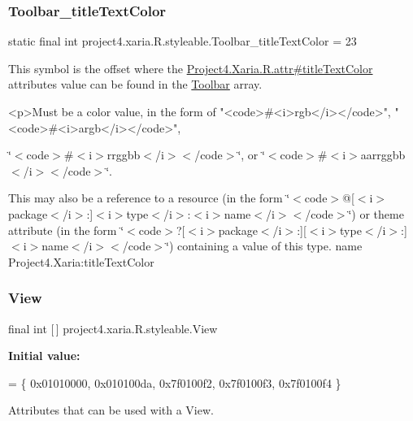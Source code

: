 \subsubsection{\texorpdfstring{Toolbar\+\_\+title\+Text\+Color}{Toolbar\_titleTextColor}}
{\footnotesize\ttfamily static final int project4.\+xaria.\+R.\+styleable.\+Toolbar\+\_\+title\+Text\+Color = 23\hspace{0.3cm}{\ttfamily [static]}}

This symbol is the offset where the \hyperlink{}{Project4.\+Xaria.\+R.\+attr\#title\+Text\+Color} attribute\textquotesingle{}s value can be found in the \hyperlink{classproject4_1_1xaria_1_1R_1_1styleable_af6c30f9e9e086f6bf4e510669443fa59}{Toolbar} array.

\begin{DoxyVerb}      <p>Must be a color value, in the form of "<code>#<i>rgb</i></code>", "<code>#<i>argb</i></code>",
\end{DoxyVerb}
 \char`\"{}$<$code$>$\#$<$i$>$rrggbb$<$/i$>$$<$/code$>$\char`\"{}, or \char`\"{}$<$code$>$\#$<$i$>$aarrggbb$<$/i$>$$<$/code$>$\char`\"{}. 

This may also be a reference to a resource (in the form \char`\"{}$<$code$>$@\mbox{[}$<$i$>$package$<$/i$>$\+:\mbox{]}$<$i$>$type$<$/i$>$\+:$<$i$>$name$<$/i$>$$<$/code$>$\char`\"{}) or theme attribute (in the form \char`\"{}$<$code$>$?\mbox{[}$<$i$>$package$<$/i$>$\+:\mbox{]}\mbox{[}$<$i$>$type$<$/i$>$\+:\mbox{]}$<$i$>$name$<$/i$>$$<$/code$>$\char`\"{}) containing a value of this type.  name Project4.\+Xaria\+:title\+Text\+Color \mbox{\label{classproject4_1_1xaria_1_1R_1_1styleable_a26a934fb1a597b7811923bdd4d3d8ecf}} 
\subsubsection{\texorpdfstring{View}{View}}
{\footnotesize\ttfamily final int \mbox{[}$\,$\mbox{]} project4.\+xaria.\+R.\+styleable.\+View\hspace{0.3cm}{\ttfamily [static]}}

{\bfseries Initial value\+:}
\begin{DoxyCode}
= \{
            0x01010000, 0x010100da, 0x7f0100f2, 0x7f0100f3,
            0x7f0100f4
        \}
\end{DoxyCode}
Attributes that can be used with a View. 

